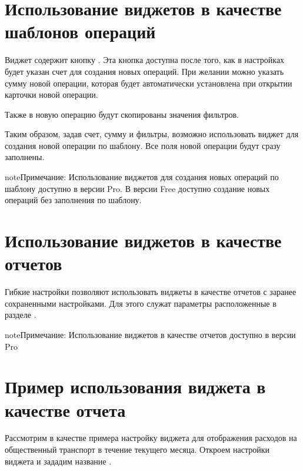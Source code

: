\documentclass[a4paper,10pt,russian]{sphinxmanual}
\begin{document}
\noindent{}
\noindent{}


\section{Использование виджетов в качестве шаблонов операций}
\label{\detokenize{widgets:id3}}
\sphinxAtStartPar
Виджет содержит кнопку . Эта кнопка доступна после того, как в настройках будет указан счет для
создания новых операций. При желании можно указать сумму новой операции, которая будет автоматически установлена
при открытии карточки новой операции.

\sphinxAtStartPar
Также в новую операцию будут скопированы значения фильтров.

\sphinxAtStartPar
Таким образом, задав счет, сумму и фильтры, возможно использовать виджет для создания новой операции по шаблону. Все
поля новой операции будут сразу заполнены.

\begin{sphinxadmonition}{note}{Примечание:}
\sphinxAtStartPar
Использование виджетов для создания новых операций по шаблону доступно в версии Pro. В версии Free доступно создание новых операций без заполнения по шаблону.
\end{sphinxadmonition}


\section{Использование виджетов в качестве отчетов}
\label{\detokenize{widgets:id4}}
\sphinxAtStartPar
Гибкие настройки позволяют использовать виджеты в качестве отчетов с заранее сохраненными настройками. Для этого
служат параметры расположенные в разделе .

\begin{sphinxadmonition}{note}{Примечание:}
\sphinxAtStartPar
Использование виджетов в качестве отчетов доступно в версии Pro
\end{sphinxadmonition}


\section{Пример использования виджета в качестве отчета}
\label{\detokenize{widgets:id5}}
\sphinxAtStartPar
Рассмотрим в качестве примера настройку виджета для отображения расходов на общественный транспорт в течение текущего месяца.
Откроем настройки виджета и зададим название .
\end{document}
